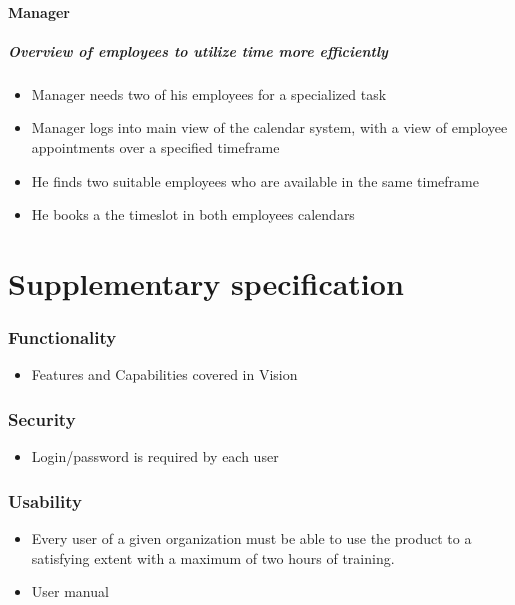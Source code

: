 \documentclass[10pt]{article}
\begin{document}
\subsection{Manager}

\subsubsection{Overview of employees to utilize time more efficiently}

\begin{itemize}
\item Manager needs two of his employees for a specialized task 
\item Manager logs into main view of the calendar system, with a view of employee appointments over a specified timeframe 
\item He finds two suitable employees who are available in the same timeframe 
\item He books a the timeslot in both employees calendars
\end{itemize}


\part{Supplementary specification}
\section{Functionality}
\begin{itemize}
\item Features and Capabilities covered in Vision 
\end{itemize}


\section{Security}
\begin{itemize}
\item Login/password is required by each user
\end{itemize}

\section{Usability}

\begin{itemize}
\item Every user of a given organization must be able to use the product to a satisfying extent with a maximum of two hours of training.
\item User manual
\end{itemize}
\end{document}
